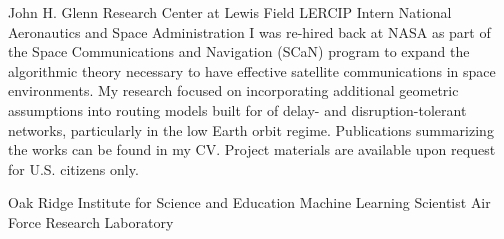 \documentclass[11pt,a4paper,sans]{moderncv} %
\begin{document}
			 {John H. Glenn Research Center at Lewis Field}
			 {LERCIP Intern}
			 {National Aeronautics and Space Administration}{}{\vspace{3pt}
I was re-hired back at NASA as part of the Space Communications and Navigation (SCaN) program to expand the algorithmic theory necessary to have effective satellite communications in space environments. My research focused on incorporating additional geometric assumptions into routing models built for of delay- and disruption-tolerant networks, particularly in the low Earth orbit regime.
Publications summarizing the works can be found in my CV. Project materials are available upon request for U.S. citizens only. 
}
\vspace{0.75em}


			 {Oak Ridge Institute for Science and Education}
			 {Machine Learning Scientist}
			 {Air Force Research Laboratory}{}{\vspace{3pt}}
\end{document}
